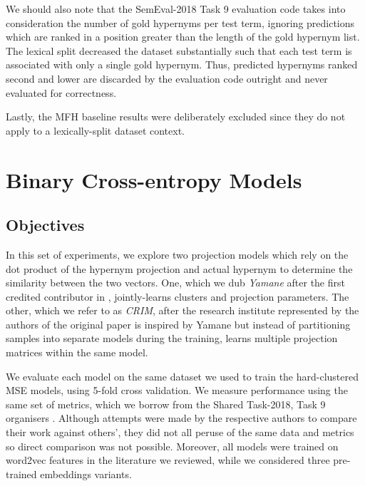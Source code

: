 We should also note that the SemEval-2018 Task 9 evaluation code takes into consideration the number of gold hypernyms per test term, ignoring predictions which are ranked in a position greater than the length of the gold hypernym list.  The lexical split decreased the dataset substantially such that each test term is associated with only a single gold hypernym.  Thus, predicted hypernyms ranked second and lower are discarded by the evaluation code outright and never evaluated for correctness.  

Lastly, the \ac{MFH} baseline results were deliberately excluded since they do not apply to a lexically-split dataset context.

\section{Binary Cross-entropy Models}
\subsection{Objectives}
In this set of experiments, we explore two projection models which rely on the dot product of the hypernym projection and actual hypernym to determine the similarity between the two vectors.  One, which we dub \textit{Yamane} after the first credited contributor in \citep{yamane2016distributional}, jointly-learns clusters and projection parameters.  The other, which we refer to as \textit{CRIM}, after the research institute represented by the authors of the original paper \citep{bernier2018crim} is inspired by Yamane but instead of partitioning samples into separate models during the training, learns multiple projection matrices within the same model.

We evaluate each model on the same dataset we used to train the hard-clustered MSE  models, using 5-fold cross validation.  We measure performance using the same set of metrics, which we borrow from the Shared Task-2018, Task 9 organisers \citep{camacho2018semeval}.  Although attempts were made by the respective authors to compare their work against others', they did not all peruse of the same data and metrics so direct comparison was not possible.  Moreover, all models were trained on word2vec features in the literature we reviewed, while we considered three pre-trained embeddings variants.  

